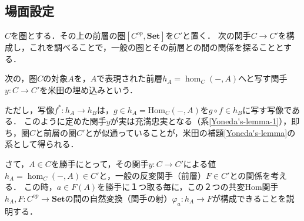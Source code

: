 \documentclass[uplatex, 12pt, dvipdfmx]{jsreport}
\begin{document}
\subsection{場面設定}

$C$を圏とする．その上の前層の圏$[C^{op},\mathbf{Set}]$を$C'$と置く．
次の関手$C\to C'$を構成し，これを調べることで，一般の圏とその前層との間の関係を探ることとする．

\begin{definition}
    次の，圏$C$の対象$A$を，$A$で表現された前層$h_A=\hom_C(-,A)$へと写す関手$y:C\to C'$を米田の埋め込みという．
    \begin{center}\end{center}
    ただし，写像$f^*:h_A\to h_B$は，$g\in h_A=\mathrm{Hom}_C(-,A)$を$g\circ f\in h_B$に写す写像である．
    このように定めた関手$y$が実は充満忠実となる（系\ref{Yoneda's-lemma-1}），即ち，圏$C$と前層の圏$C'$とが似通っていることが，米田の補題\ref{Yoneda's-lemma}の系として得られる．
\end{definition}

さて，$A\in C$を勝手にとって，その関手$y:C\to C'$による値$h_A=\hom_C(-,A) \in C'$と，一般の反変関手（前層）$F\in C'$との関係を考える．
この時，$a\in F(A)$を勝手に１つ取る毎に，この２つの共変Hom関手$h_A,F:C^{op}\to \mathbf{Set}$の間の自然変換（関手の射）$\varphi_a:h_A\to F$が構成できることを説明する．
\end{document}
